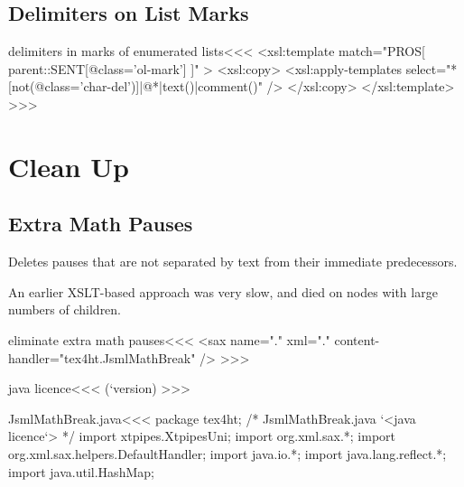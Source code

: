 \documentclass{article}
\begin{document}
\subsection{Delimiters on List Marks}



\<delimiters in marks of enumerated lists\><<<
<xsl:template match="PROS[  parent::SENT[@class='ol-mark'] ]" >
   <xsl:copy>
      <xsl:apply-templates 
           select="*[not(@class='char-del')]|@*|text()|comment()" />  
   </xsl:copy>
</xsl:template> 
>>>


\section{Clean Up}


\subsection{Extra Math Pauses}


Deletes pauses that are not separated by text from their immediate
predecessors. 

An earlier XSLT-based approach was very slow, and died
on nodes with large numbers of children.


\<eliminate extra math pauses\><<<
<sax name="." xml="." content-handler="tex4ht.JsmlMathBreak" />
>>>




\<java licence\><<<
(`version)
>>>


 
\<JsmlMathBreak.java\><<< 
package tex4ht;
/*
JsmlMathBreak.java `<java licence`>
*/
import xtpipes.XtpipesUni;
import org.xml.sax.*;
import org.xml.sax.helpers.DefaultHandler;
import java.io.*;
import java.lang.reflect.*;
import java.util.HashMap;
\end{document}
